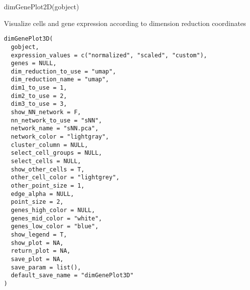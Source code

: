 \documentclass[a4paper]{book}
\begin{document}
%
\begin{SeeAlso}\relax
{}
\end{SeeAlso}
%
\begin{Examples}
\begin{ExampleCode}
    dimGenePlot2D(gobject)
\end{ExampleCode}
\end{Examples}
%
\begin{Description}\relax
Visualize cells and gene expression according to dimension reduction coordinates
\end{Description}
%
\begin{Usage}
\begin{verbatim}
dimGenePlot3D(
  gobject,
  expression_values = c("normalized", "scaled", "custom"),
  genes = NULL,
  dim_reduction_to_use = "umap",
  dim_reduction_name = "umap",
  dim1_to_use = 1,
  dim2_to_use = 2,
  dim3_to_use = 3,
  show_NN_network = F,
  nn_network_to_use = "sNN",
  network_name = "sNN.pca",
  network_color = "lightgray",
  cluster_column = NULL,
  select_cell_groups = NULL,
  select_cells = NULL,
  show_other_cells = T,
  other_cell_color = "lightgrey",
  other_point_size = 1,
  edge_alpha = NULL,
  point_size = 2,
  genes_high_color = NULL,
  genes_mid_color = "white",
  genes_low_color = "blue",
  show_legend = T,
  show_plot = NA,
  return_plot = NA,
  save_plot = NA,
  save_param = list(),
  default_save_name = "dimGenePlot3D"
)
\end{verbatim}
\end{Usage}
%
\end{document}
